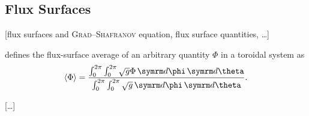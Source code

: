 \subsection{Flux Surfaces}

[flux surfaces and \textsc{Grad}--\textsc{Shafranov} equation, flux surface quantities, \ldots]

\textcite{dHaeseleer91} defines the flux-surface average of an arbitrary quantity $\Phi$ in a toroidal system as
\begin{gather}
  \langle \Phi \rangle = \frac{\int_{0}^{2 \pi} \int_{0}^{2 \pi} \sqrt{g} \Phi \, \diff \phi \, \diff \theta}{\int_{0}^{2 \pi} \int_{0}^{2 \pi} \sqrt{g} \, \diff \phi \, \diff \theta}. \label{eq:flux_surface_avg}
\end{gather}

[\ldots]

